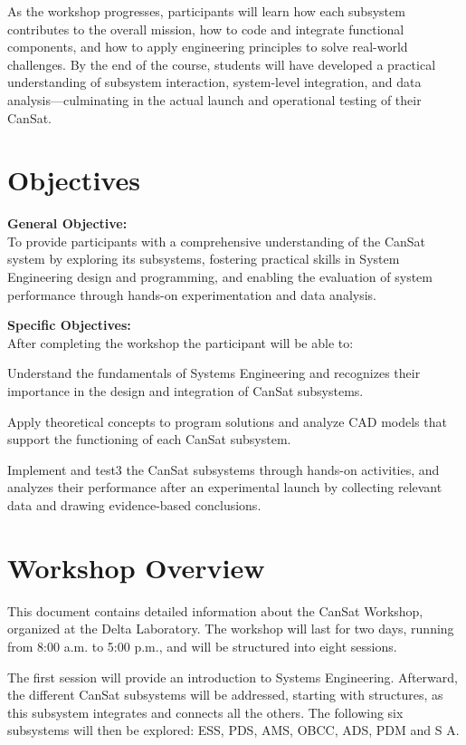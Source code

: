 \documentclass[a4paper,12pt]{article}
\begin{document}
As the workshop progresses, participants will learn how each subsystem contributes to the overall mission, how to code and integrate functional components, and how to apply engineering principles to solve real-world challenges. By the end of the course, students will have developed a practical understanding of subsystem interaction, system-level integration, and data analysis—culminating in the actual launch and operational testing of their CanSat.


\newpage

\section{Objectives}

\textbf{General Objective: }
\\
To provide participants with a comprehensive understanding of the CanSat system by exploring its subsystems, fostering practical skills in System Engineering design and programming, and enabling the evaluation of system performance through hands-on experimentation and data analysis.


\textbf{Specific Objectives:}
\\
After completing the workshop the participant will be able to:

Understand the fundamentals of Systems Engineering and recognizes their importance in the design and integration of CanSat subsystems.

Apply theoretical concepts to program solutions and analyze CAD models that support the functioning of each CanSat subsystem.

Implement and test3 the CanSat subsystems through hands-on activities, and analyzes their performance after an experimental launch by collecting relevant data and drawing evidence-based conclusions.


\newpage

\section{Workshop Overview}

This document contains detailed information about the CanSat Workshop, organized at the Delta Laboratory. The workshop will last for two days, running from 8:00 a.m. to 5:00 p.m., and will be structured into eight sessions.

The first session will provide an introduction to Systems Engineering. Afterward, the different CanSat subsystems will be addressed, starting with structures, as this subsystem integrates and connects all the others. The following six subsystems will then be explored: ESS, PDS, AMS, OBCC, ADS, PDM and S A. 
\end{document}
